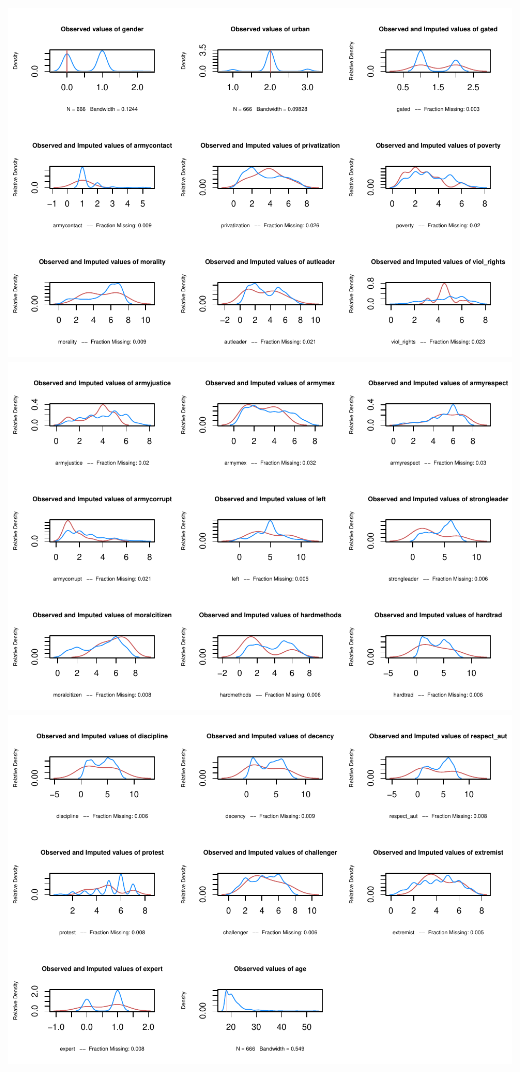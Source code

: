 \documentclass[
  12pt,
]{article}
\begin{document}
\includegraphics{marko-oliver_final-proj_files/figure-latex/unnamed-chunk-11-1.pdf}
\includegraphics{marko-oliver_final-proj_files/figure-latex/unnamed-chunk-11-2.pdf}
\includegraphics{marko-oliver_final-proj_files/figure-latex/unnamed-chunk-11-3.pdf}
\end{document}
